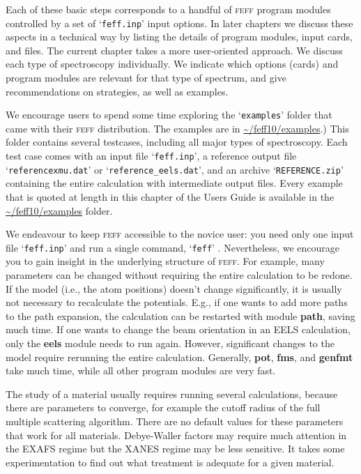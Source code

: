 \documentclass[11pt,oneside]{report} %
\newcommand{\program}[1]{\textsc{#1}}
\newcommand{\feff}{\program{feff}}
\newcommand{\file}[1]{`\texttt{#1}'}
\newcommand{\module}[1]{\textrm{\bf{#1}}}
\begin{document}
Each of these basic steps corresponds to a handful of {\feff} program modules controlled by a set of \file{feff.inp} input options.  In later chapters we discuss these aspects in a technical way by listing the details of program modules, input cards, and files.  The current chapter takes a more user-oriented approach.  We discuss each type of spectroscopy individually.  We indicate which options (cards) and program modules are relevant for that type of spectrum, and give recommendations on strategies, as well as examples.

We encourage users to spend some time exploring the \file{examples} folder that came with their {\feff} distribution.  
The examples are in
\url{\~/feff10/examples}.)  This folder contains several testcases, including all major types of spectroscopy.  Each test case comes with an input file \file{feff.inp}, a reference output file \file{referencexmu.dat} or \file{reference\_eels.dat}, and an archive \file{REFERENCE.zip} containing the entire calculation with intermediate output files.  Every example that is quoted at length in this chapter of the Users Guide is available in the 
\url{\~/feff10/examples} folder.

We endeavour to keep {\feff} accessible to the novice user: you need only one input file \file{feff.inp} and run a single command, \file{feff} 
.  Nevertheless, we encourage you to gain insight in the underlying structure of {\feff}.  For example, many parameters can be changed without requiring the entire calculation to be redone.  If the model (i.e., the atom positions) doesn't change significantly, it is usually not necessary to recalculate the potentials.  E.g., if one wants to add more paths to the path expansion, the calculation can be restarted with module \module{path}, saving much time.  If one wants to change the beam orientation in an EELS calculation, only the \module{eels} module needs to run again.  However, significant changes to the model require rerunning the entire calculation.  Generally, \module{pot}, \module{fms}, and \module{genfmt} take much time, while all other program modules are very fast.

The study of a material usually requires running several calculations, because there are parameters to converge, for example the cutoff radius of the full multiple scattering algorithm.  There are no default values for these parameters that work for all materials.  Debye-Waller factors may require much attention in the EXAFS regime but the XANES regime may be less sensitive.  It takes some experimentation to find out what treatment is adequate for a given material.
\end{document}
